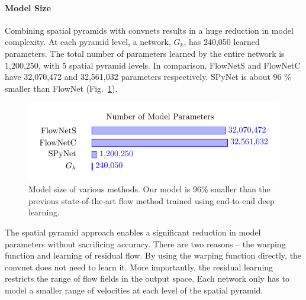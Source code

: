 \documentclass[10pt,twocolumn,letterpaper]{article}
\begin{document}
\paragraph{Model Size}
Combining spatial pyramids with convnets results in a huge reduction in model complexity.
At each pyramid level, a network, $G_k$, has 240,050 learned parameters.
The total number of parameters learned by the entire network is 1,200,250, with 5 spatial pyramid levels.
In comparison, FlowNetS and FlowNetC \cite{dosovitskiy2015flownet} have 32,070,472 and 32,561,032 parameters respectively. 
SPyNet is about 96 \% smaller than FlowNet (Fig.~\ref{fig:modelSize}).
\begin{figure}[t]
\centerline{
   \includegraphics[width=\linewidth]{modelSize.pdf}
}
   \caption{Model size of various methods. Our model is 96\% smaller
     than the previous state-of-the-art flow method trained using end-to-end deep learning.}
\label{fig:modelSize}
\end{figure}

The spatial pyramid approach enables a significant reduction in model parameters without sacrificing accuracy. 
There are two reasons -- the warping function and learning of residual flow. 
By using the warping function directly, the convnet does not need to
learn it. %
More importantly, the residual learning restricts the range of flow fields in the output space. 
Each network only has to model a smaller range of velocities at each level of the spatial pyramid. 
\end{document}
